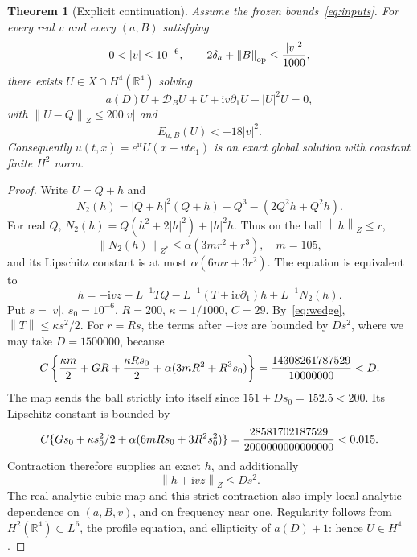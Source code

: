 \documentclass[11pt,a4paper]{article}
\newtheorem{theorem}{Theorem}[section]
\theoremstyle{remark}\newtheorem{remark}[theorem]{Remark}
\newcommand{\R}{\mathbb R}\newcommand{\C}{\mathbb C}
\newcommand{\ii}{\mathrm i}\newcommand{\dd}{\,\mathrm d}
\newcommand{\norm}[1]{\left\|#1\right\|}
\begin{document}
\begin{theorem}[Explicit continuation]\label{thm:explicit}
Assume the frozen bounds~\eqref{eq:inputs}. For every real $v$ and every $(a,B)$ satisfying
\begin{equation}\label{eq:wedge}
 0<|v|\le10^{-6},\qquad
 2\delta_a+\norm B_{\mathrm{op}}\le{|v|^2\over1000},
\end{equation}
there exists $U\in X\cap H^4(\R^4)$ solving
\[
 a(D)U+\mathcal D_BU+U+\ii v\partial_1U-|U|^2U=0,
\]
with $\norm{U-Q}_Z\le200|v|$ and
\begin{equation}\label{eq:Enegative}
 E_{a,B}(U)<-18|v|^2.
\end{equation}
Consequently $u(t,x)=e^{\ii t}U(x-vte_1)$ is an exact global solution with constant finite $H^2$ norm.
\end{theorem}
\begin{proof}
Write $U=Q+h$ and
\[
 N_2(h)=|Q+h|^2(Q+h)-Q^3-(2Q^2h+Q^2\overline h).
\]
For real $Q$, $N_2(h)=Q(h^2+2|h|^2)+|h|^2h$. Thus on the ball $\norm h_Z\le r$,
\[
 \norm{N_2(h)}_{Z^*}\le\alpha(3mr^2+r^3),\quad m=105,
\]
and its Lipschitz constant is at most $\alpha(6mr+3r^2)$. The equation is equivalent to
\begin{equation}\label{eq:fixedpoint}
 h=-\ii vz-L^{-1}TQ-L^{-1}(T+\ii v\partial_1)h+L^{-1}N_2(h).
\end{equation}
Put $s=|v|$, $s_0=10^{-6}$, $R=200$, $\kappa=1/1000$, $C=29$. By~\eqref{eq:wedge}, $\norm T\le\kappa s^2/2$. For $r=Rs$, the terms after $-\ii vz$ are bounded by $Ds^2$, where we may take $D=1500000$, because
\begin{align*}
 C\left\{{\kappa m\over2}+GR+{\kappa Rs_0\over2}
 +\alpha(3mR^2+R^3s_0)\right\}
 ={14308261787529\over10000000}<D.
\end{align*}
The map sends the ball strictly into itself since $151+Ds_0=152.5<200$. Its Lipschitz constant is bounded by
\[
 C\{Gs_0+\kappa s_0^2/2+\alpha(6mRs_0+3R^2s_0^2)\}
 ={28581702187529\over2000000000000000}<0.015.
\]
Contraction therefore supplies an exact $h$, and additionally
\begin{equation}\label{eq:werror}
 \norm{h+\ii vz}_Z\le Ds^2.
\end{equation}
The real-analytic cubic map and this strict contraction also imply local analytic dependence on $(a,B,v)$, and on frequency near one. Regularity follows from $H^2(\R^4)\subset L^6$, the profile equation, and ellipticity of $a(D)+1$: hence $U\in H^4$.


\end{proof}
\end{document}
